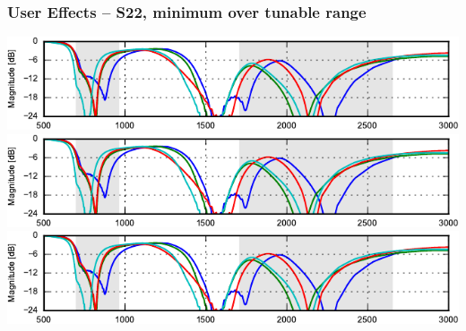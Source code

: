 \begin{frame}
    \frametitle{User Effects -- S22, minimum over tunable range}
    \begin{center}
        \includegraphics{img/soren/ue/design2sn/s22side.pdf}\\
        \includegraphics{img/soren/ue/design2sn/s22side.pdf}\\
        \includegraphics{img/soren/ue/design2sn/s22side.pdf}
    \end{center}
    \legendfooter
\end{frame}

% 

